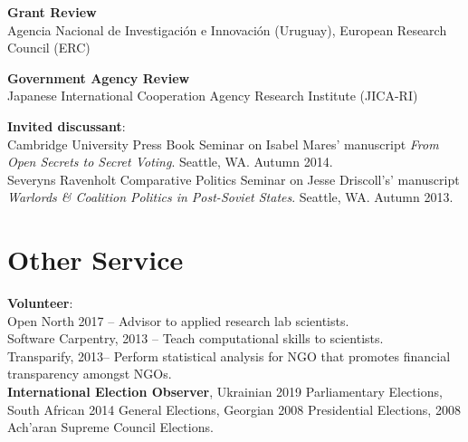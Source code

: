 \documentclass[margin,line]{res}
\begin{document}
{\begin{resume}
\textbf{Grant Review}\\
Agencia Nacional de Investigaci\'on e Innovaci\'on (Uruguay), European
Research Council (ERC)

\textbf{Government Agency Review}\\
Japanese International Cooperation Agency Research Institute (JICA-RI)


\textbf{Invited discussant}: \\
  Cambridge University Press Book Seminar on
Isabel Mares' manuscript \emph{From Open Secrets to Secret Voting}. Seattle, WA. Autumn 2014. \\
 Severyns Ravenholt Comparative Politics Seminar on
Jesse Driscoll's' manuscript \emph{Warlords \& Coalition Politics in
  Post-Soviet States}. Seattle, WA. Autumn 2013. \par\smallskip





\section{\sc  Other Service}
\textbf{Volunteer}: \\
Open North 2017 -- Advisor to applied research lab
scientists.\\
Software Carpentry, 2013 -- 
Teach computational skills to
scientists.\\
Transparify, 2013--
 Perform statistical analysis for NGO that promotes
financial transparency amongst NGOs.  \\
\textbf{International Election Observer}, Ukrainian 2019 Parliamentary
Elections, South African 2014 General
Elections, Georgian 2008 Presidential Elections, 2008 Ach'aran Supreme
Council Elections. 


\end{resume}}
\end{document}
